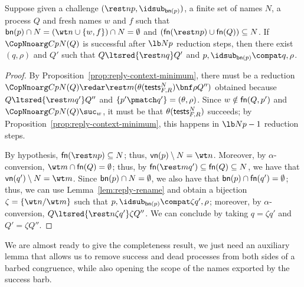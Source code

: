 \documentclass{LMCS}
\begin{document}
\begin{prop}
\label{thm:lts-2-succeed-reply}
Suppose given a challenge $(\rest n p,\idsub_{{\sf bn}(p)})$, a finite set of names $N$, a process $Q$ and fresh names $w$ and $f$ such that ${\sf bn}(p) \cap N = (\wt n \cup \{w,f\}) \cap N = \emptyset$ and $({\sf fn}(\rest n p) \cup {\sf fn}(Q)) \subseteq N$.
If $\CopNnoarg C p N (Q)$ is successful after $\lb N p$ reduction steps,
then there exist $(q,\rho)$ and $Q'$ such that $Q\ltsred{\rest n q}Q'$
and $p,\idsub_{{\sf bn}(p)}\compat q,\rho$.
\end{prop}
\begin{proof}
By Proposition~\ref{prop:reply-context-minimum},
there must be a reduction $\CopNnoarg C p N (Q) \redar \rest m (\theta ({\sf tests}^N_{F,R})\bnf\rho Q'')$
obtained because $Q\ltsred{\rest m q'}Q''$ and $\{p'\pmatch q'\}=(\theta,\rho)$.
Since $w\notin {\sf fn}(Q,p')$ and $\CopNnoarg C p N (Q)\suc_w$, it must be that
$\theta ({\sf tests}^N_{F,R})$ succeeds; by 
Proposition~\ref{prop:reply-context-minimum}, this happens in $\lb N p -1$ reduction steps.

By hypothesis, ${\sf fn}(\rest n p) \subseteq N$; thus, ${\sf vn}(p) \setminus N = \wt n$.
Moreover, by $\alpha$-conversion, $\wt m \cap {\sf fn}(Q) = \emptyset$;
thus, by ${\sf fn}(\rest m q') \subseteq {\sf fn}(Q) \subseteq N$, we have
that ${\sf vn}(q') \setminus N = \wt m$. Since ${\sf bn}(p) \cap N = \emptyset$,
we also have that ${\sf bn}(p) \cap {\sf fn}(q') = \emptyset$; thus, we can
use Lemma~\ref{lem:reply-rename} and obtain a bijection $\zeta = \{\wt n / \wt m\}$ 
such that $p,\idsub_{{\sf bn}(p)}\compat \zeta q',\rho$; moreover, by $\alpha$-conversion,
$Q\ltsred{\rest n \zeta q'} \zeta Q''$. We can conclude by taking $q = \zeta q'$ and
$Q' = \zeta Q''$.
\end{proof}


We are almost ready to give the completeness result, we just need an auxiliary lemma that allows us to remove
success and dead processes from both sides of a barbed congruence, while also opening the scope of the names
exported by the success barb.
\end{document}
